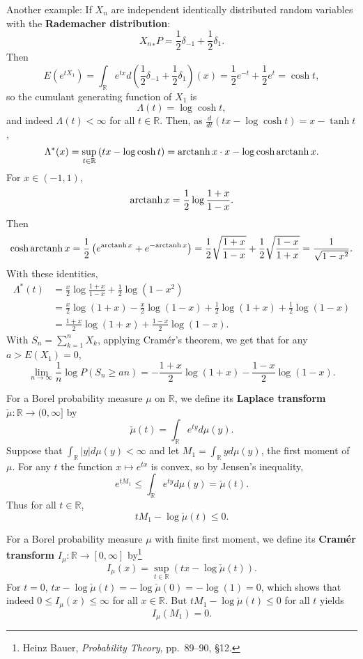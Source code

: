 \documentclass{article}
\newcommand{\arctanh}{\ensuremath\mathrm{arctanh}\,}
\theoremstyle{definition}
\theoremstyle{definition}
\begin{document}
Another example: If $X_n$ are independent identically distributed random
variables with the \textbf{Rademacher distribution}:
\[
{X_n}_*P = \frac{1}{2} \delta_{-1}+\frac{1}{2}\delta_1. 
\]
Then 
\[
E(e^{tX_1}) = \int_\mathbb{R} e^{tx} d\left(\frac{1}{2}\delta_{-1}+\frac{1}{2}\delta_1\right)(x)
=\frac{1}{2}e^{-t}+\frac{1}{2}e^t
=\cosh t,
\]
so the cumulant generating function of $X_1$ is
\[
\Lambda(t) = \log \cosh t,
\]
and indeed $\Lambda(t)<\infty$ for all $t \in \mathbb{R}$. 
Then, as $\frac{d}{dt}(tx-\log \cosh t) = x - \tanh t$,
\[
\Lambda^*(x) = \sup_{t \in \mathbb{R}} \left(tx - \log \cosh t\right)
=\arctanh x \cdot x- \log \cosh \arctanh x.
\]
For $x \in (-1,1)$, 
\[
\arctanh x = \frac{1}{2} \log \frac{1+x}{1-x}.
\]
Then
\[
\cosh \arctanh x = \frac{1}{2}\left(e^{\arctanh x} + e^{-\arctanh x}\right)
=\frac{1}{2} \sqrt{\frac{1+x}{1-x}} + \frac{1}{2} \sqrt{\frac{1-x}{1+x}} 
=\frac{1}{\sqrt{1-x^2}}.
\]
With these identities,
\begin{align*}
\Lambda^*(t)& = \frac{x}{2} \log \frac{1+x}{1-x} + \frac{1}{2} \log(1-x^2)\\
&=\frac{x}{2} \log (1+x) - \frac{x}{2} \log(1-x) + \frac{1}{2} \log(1+x) + \frac{1}{2} \log(1-x)\\
&=\frac{1+x}{2} \log(1+x) + \frac{1-x}{2} \log(1-x).
\end{align*}
With $S_n=\sum_{k=1}^n X_k$,
applying Cram\'er's theorem, we get that for 
any $a>E(X_1)=0$, 
\[
\lim_{n \to \infty} \frac{1}{n} \log P(S_n \geq an) = -\frac{1+x}{2} \log(1+x) - \frac{1-x}{2} \log(1-x).
\]

For a Borel probability measure $\mu$ on $\mathbb{R}$,
we define its \textbf{Laplace transform} $\check{\mu}:\mathbb{R} \to (0,\infty]$ by
\[
\check{\mu}(t) = \int_\mathbb{R} e^{ty} d\mu(y).
\]
Suppose that $\int_\mathbb{R} |y| d\mu(y)<\infty$ and let
 $M_1 = \int_\mathbb{R} y d\mu(y)$, the first moment of $\mu$.
For any $t$ the function $x \mapsto e^{tx}$ is convex, so by  Jensen's inequality,
\[
e^{tM_1} \leq \int_\mathbb{R} e^{ty} d\mu(y) = \check{\mu}(t).
\]
Thus for all $t \in \mathbb{R}$,
\[
t M_1 - \log \check{\mu}(t) \leq 0.
\]

For a Borel probability measure $\mu$ with finite first moment, we define
 its \textbf{Cram\'er transform}
$I_\mu:\mathbb{R} \to [0,\infty]$ by\footnote{Heinz Bauer, {\em Probability Theory},
pp.~89--90,  \S 12.}
\[
I_\mu(x) = \sup_{t \in \mathbb{R}} (tx - \log \check{\mu}(t)).
\]
For $t=0$, $tx-\log \check{\mu}(t)=-\log \check{\mu}(0)=-\log(1)=0$, which shows that
indeed $0 \leq I_\mu(x) \leq \infty$ for all $x \in \mathbb{R}$. 
But $tM_1 - \log \check{\mu}(t) \leq 0$ for all $t$ yields 
\[
I_\mu(M_1)  = 0.
\]
\end{document}
